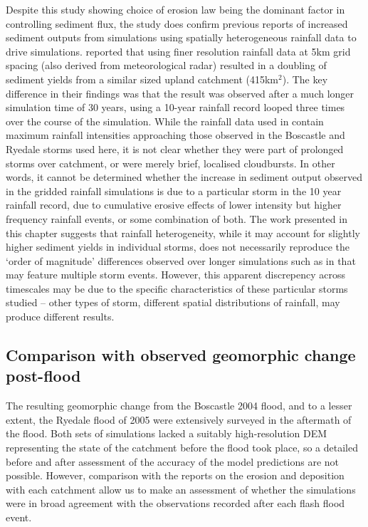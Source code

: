 Despite this study showing choice of erosion law being the dominant factor in controlling sediment flux, the study does confirm previous reports of increased sediment outputs from simulations using spatially heterogeneous rainfall data to drive simulations. \citet{coulthard2016sensitivity} reported that using finer resolution rainfall data at 5km grid spacing (also derived from meteorological radar) resulted in a doubling of sediment yields from a similar sized upland catchment (415km\(^2\)). The key difference in their findings was that the result was observed after a much longer simulation time of 30 years, using a 10-year rainfall record looped three times over the course of the simulation. While the rainfall data used in \citet{coulthard2016sensitivity} contain maximum rainfall intensities approaching those observed in the Boscastle and Ryedale storms used here, it is not clear whether they were part of prolonged storms over catchment, or were merely brief, localised cloudbursts. In other words, it cannot be determined whether the increase in sediment output observed in the \citet{coulthard2016sensitivity} gridded rainfall simulations is due to a particular storm in the 10 year rainfall record, due to cumulative erosive effects of lower intensity but higher frequency rainfall events, or some combination of both. The work presented in this chapter suggests that rainfall heterogeneity, while it may account for slightly higher sediment yields in individual storms, does not necessarily reproduce the `order of magnitude' differences observed over longer simulations such as in \citet{coulthard2016sensitivity} that may feature multiple storm events. However, this apparent discrepency across timescales may be due to the specific characteristics of these particular storms studied -- other types of storm, different spatial distributions of rainfall, may produce different results.

\subsection{Comparison with observed geomorphic change post-flood}

The resulting geomorphic change from the Boscastle 2004 flood, and to a lesser extent, the Ryedale flood of 2005 were extensively surveyed in the aftermath of the flood. Both sets of simulations lacked a suitably high-resolution DEM representing the state of the catchment before the flood took place, so a detailed before and after assessment of the accuracy of the model predictions are not possible. However, comparison with the reports on the erosion and deposition with each catchment allow us to make an assessment of whether the simulations were in broad agreement with the observations recorded after each flash flood event.

